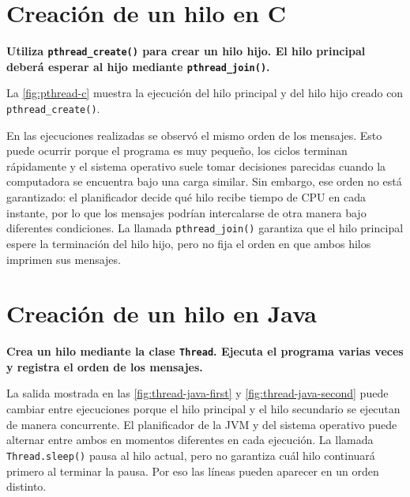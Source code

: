 \documentclass[12pt,oneside]{template/liverpoolthesis}
\begin{document}


\chapter{Creación de un hilo en C}

\textbf{Utiliza \texttt{pthread\_create()} para crear un hilo hijo.
El hilo principal deberá esperar al hijo mediante \texttt{pthread\_join()}.
}

La \autoref{fig:pthread-c} muestra la ejecución del hilo principal y del hilo
hijo creado con \texttt{pthread\_create()}.

En las ejecuciones realizadas se observó el mismo orden de los mensajes. Esto
puede ocurrir porque el programa es muy pequeño, los ciclos terminan rápidamente
y el sistema operativo suele tomar decisiones parecidas cuando la computadora
se encuentra bajo una carga similar. Sin embargo, ese orden no está garantizado:
el planificador decide qué hilo recibe tiempo de CPU en cada instante, por lo que
los mensajes podrían intercalarse de otra manera bajo diferentes condiciones.
La llamada \texttt{pthread\_join()} garantiza que el hilo principal espere la
terminación del hilo hijo, pero no fija el orden en que ambos hilos imprimen sus
mensajes.



\chapter{Creación de un hilo en Java}

\textbf{Crea un hilo mediante la clase \texttt{Thread}.
Ejecuta el programa varias veces y registra el orden de los mensajes.}

La salida mostrada en las \autoref{fig:thread-java-first} y
\autoref{fig:thread-java-second} puede cambiar entre ejecuciones porque el hilo principal y el hilo secundario se
ejecutan de manera concurrente. El planificador de la JVM y del sistema
operativo puede alternar entre ambos en momentos diferentes en cada ejecución.
La llamada \texttt{Thread.sleep()} pausa al hilo actual, pero no garantiza cuál
hilo continuará primero al terminar la pausa. Por eso las líneas pueden
aparecer en un orden distinto.


\end{document}
